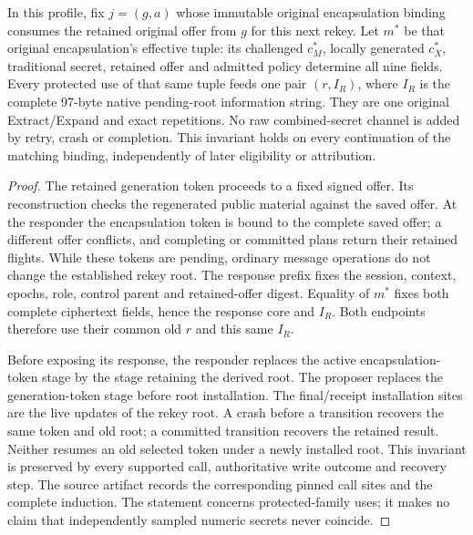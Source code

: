 \begin{lemma}
\label{lem:cb-native-root-use}
In this profile, fix $j=(g,a)$ whose immutable original encapsulation
binding consumes the retained original offer from $g$ for this next rekey.
Let $m^*$ be that original encapsulation's effective tuple: its challenged
$c_M^*$, locally generated $c_X^*$, traditional secret, retained offer and
admitted policy determine all nine fields. Every protected
use of that same tuple feeds one pair $(r,I_R)$, where $I_R$ is the complete
97-byte native pending-root information string. They are one original
Extract/Expand and exact repetitions. No raw combined-secret channel is
added by retry, crash or completion. This invariant holds on every
continuation of the matching binding, independently of later eligibility
or attribution.
\end{lemma}
\begin{proof}
The retained generation token proceeds to a fixed signed offer. Its
reconstruction checks the regenerated public material against the saved
offer. At the responder the encapsulation token is bound to the complete
saved offer; a different offer conflicts, and completing or committed
plans return their retained flights. While these tokens are pending,
ordinary message operations do not change the established rekey root.
The response prefix fixes the session, context, epochs, role, control
parent and retained-offer digest. Equality of $m^*$ fixes both complete
ciphertext fields, hence the response core and $I_R$. Both endpoints
therefore use their common old $r$ and this same $I_R$.

Before exposing its response, the responder replaces the active
encapsulation-token stage by the stage retaining the derived root.
The proposer replaces the generation-token stage before root installation.
The final/receipt installation sites are the live updates of the rekey
root. A crash before a transition recovers the same token and old root; a
committed transition recovers the retained result. Neither resumes an old
selected token under a newly installed root. This invariant is preserved
by every supported call, authoritative write outcome and recovery step.
The source artifact records the corresponding pinned call sites and the
complete induction. The statement concerns protected-family uses; it
makes no claim that independently sampled numeric secrets never coincide.
\end{proof}

